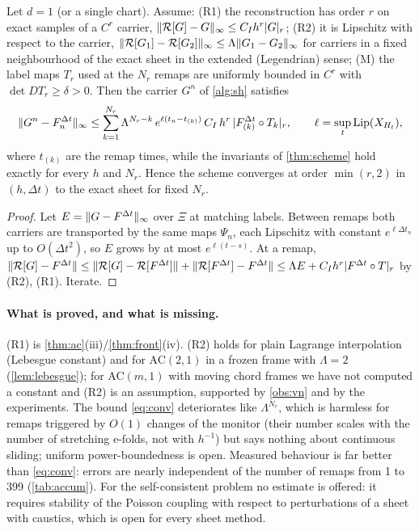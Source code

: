\begin{theorem}\label{thm:conv}
Let $d=1$ (or a single chart). Assume: \textup{(R1)} the reconstruction has order $r$ on exact samples of a $C^r$
carrier, $\lVert \mathcal R[G]-G\rVert_\infty\le C_Ih^r\lvert G\rvert_{r}$; \textup{(R2)} it is Lipschitz with respect to the carrier,
$\lVert \mathcal R[G_1]-\mathcal R[G_2]\rVert_\infty\le\Lambda\lVert G_1-G_2\rVert_\infty$ for carriers in a fixed neighbourhood of the
exact sheet in the extended (Legendrian) sense; \textup{(M)} the label maps $T_r$ used at the $N_r$ remaps are
uniformly bounded in $C^{r}$ with $\det DT_r\ge\delta>0$. Then the carrier $G^n$ of \cref{alg:sh} satisfies
\begin{equation}\label{eq:conv}
\lVert G^n-F^{\Delta t}_n\rVert_\infty\le\sum_{k=1}^{N_r}\Lambda^{N_r-k}\,e^{\ell(t_n-t_{(k)})}\,C_I\,h^{r}\,\lvert F^{\Delta t}_{(k)}\circ T_k\rvert_{r},\qquad
\ell=\sup_t\operatorname{Lip}(X_{H_t}),
\end{equation}
where $t_{(k)}$ are the remap times, while the invariants of \cref{thm:scheme} hold exactly for every $h$ and $N_r$.
Hence the scheme converges at order $\min(r,2)$ in $(h,\Delta t)$ to the exact sheet for fixed $N_r$.
\end{theorem}
\begin{proof}
Let $E=\lVert G-F^{\Delta t}\rVert_\infty$ over $\Xi$ at matching labels. Between remaps both carriers are transported by the
same maps $\Psi_n$, each Lipschitz with constant $e^{\ell\Delta t_n}$ up to $O(\Delta t^2)$, so $E$ grows by at most
$e^{\ell(t-s)}$. At a remap,
$\lVert \mathcal R[G]-F^{\Delta t}\rVert\le\lVert \mathcal R[G]-\mathcal R[F^{\Delta t}]\rVert+\lVert \mathcal R[F^{\Delta t}]-F^{\Delta t}\rVert\le\Lambda E+C_Ih^r\lvert F^{\Delta t}\circ T\rvert_r$
by (R2), (R1). Iterate.
\end{proof}

\paragraph{What is proved, and what is missing.}
(R1) is \cref{thm:ac}(iii)/\cref{thm:front}(iv). (R2) holds for plain Lagrange interpolation (Lebesgue constant) and
for AC$(2,1)$ in a frozen frame with $\Lambda=2$ (\cref{lem:lebesgue}); for AC$(m,1)$ with moving chord frames we
have not computed a constant and (R2) is an assumption, supported by \cref{obs:vn} and by the experiments. The bound
\eqref{eq:conv} deteriorates like $\Lambda^{N_r}$, which is harmless for remaps triggered by $O(1)$ changes of the
monitor (their number scales with the number of stretching e-folds, not with $h^{-1}$) but says nothing about
continuous sliding; uniform power-boundedness is open. Measured behaviour is far better than \eqref{eq:conv}: errors
are nearly independent of the number of remaps from 1 to 399 (\cref{tab:accum}). For the self-consistent problem no
estimate is offered: it requires stability of the Poisson coupling with respect to perturbations of a sheet with
caustics, which is open for every sheet method.
